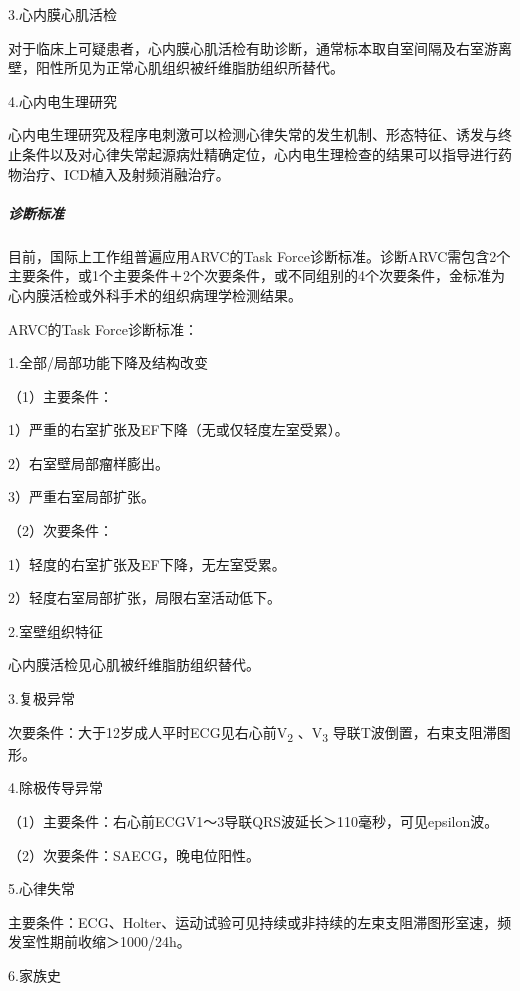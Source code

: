 \hypertarget{text00139.htmlux5cux23CHP16-3-3-1-4-1-3}{}
3.心内膜心肌活检

对于临床上可疑患者，心内膜心肌活检有助诊断，通常标本取自室间隔及右室游离壁，阳性所见为正常心肌组织被纤维脂肪组织所替代。

\hypertarget{text00139.htmlux5cux23CHP16-3-3-1-4-1-4}{}
4.心内电生理研究

心内电生理研究及程序电刺激可以检测心律失常的发生机制、形态特征、诱发与终止条件以及对心律失常起源病灶精确定位，心内电生理检查的结果可以指导进行药物治疗、ICD植入及射频消融治疗。

\subparagraph{诊断标准}

目前，国际上工作组普遍应用ARVC的Task
Force诊断标准。诊断ARVC需包含2个主要条件，或1个主要条件＋2个次要条件，或不同组别的4个次要条件，金标准为心内膜活检或外科手术的组织病理学检测结果。

ARVC的Task Force诊断标准：

\hypertarget{text00139.htmlux5cux23CHP16-3-3-1-4-2-1}{}
1.全部/局部功能下降及结构改变

（1）主要条件：

1）严重的右室扩张及EF下降（无或仅轻度左室受累）。

2）右室壁局部瘤样膨出。

3）严重右室局部扩张。

（2）次要条件：

1）轻度的右室扩张及EF下降，无左室受累。

2）轻度右室局部扩张，局限右室活动低下。

\hypertarget{text00139.htmlux5cux23CHP16-3-3-1-4-2-2}{}
2.室壁组织特征

心内膜活检见心肌被纤维脂肪组织替代。

\hypertarget{text00139.htmlux5cux23CHP16-3-3-1-4-2-3}{}
3.复极异常

次要条件：大于12岁成人平时ECG见右心前V\textsubscript{2}
、V\textsubscript{3} 导联T波倒置，右束支阻滞图形。

\hypertarget{text00139.htmlux5cux23CHP16-3-3-1-4-2-4}{}
4.除极传导异常

（1）主要条件：右心前ECGV1～3导联QRS波延长＞110毫秒，可见epsilon波。

（2）次要条件：SAECG，晚电位阳性。

\hypertarget{text00139.htmlux5cux23CHP16-3-3-1-4-2-5}{}
5.心律失常

主要条件：ECG、Holter、运动试验可见持续或非持续的左束支阻滞图形室速，频发室性期前收缩＞1000/24h。

\hypertarget{text00139.htmlux5cux23CHP16-3-3-1-4-2-6}{}
6.家族史

